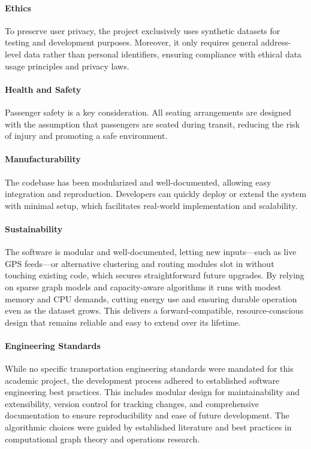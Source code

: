 \paragraph{Ethics} To preserve user privacy, the project exclusively uses synthetic datasets for testing and development purposes. Moreover, it only requires general address-level data rather than personal identifiers, ensuring compliance with ethical data usage principles and privacy laws.

\paragraph{Health and Safety} Passenger safety is a key consideration. All seating arrangements are designed with the assumption that passengers are seated during transit, reducing the risk of injury and promoting a safe environment.

\paragraph{Manufacturability} The codebase has been modularized and well-documented, allowing easy integration and reproduction. Developers can quickly deploy or extend the system with minimal setup, which facilitates real-world implementation and scalability.

\paragraph{Sustainability} The software is modular and well-documented, letting new inputs—such as live GPS feeds—or alternative clustering and routing modules slot in without touching existing code, which secures straightforward future upgrades. By relying on sparse graph models and capacity-aware algorithms it runs with modest memory and CPU demands, cutting energy use and ensuring durable operation even as the dataset grows. This delivers a forward-compatible, resource-conscious design that remains reliable and easy to extend over its lifetime.

\paragraph{Engineering Standards} While no specific transportation engineering standards were mandated for this academic project, the development process adhered to established software engineering best practices. This includes modular design for maintainability and extensibility, version control for tracking changes, and comprehensive documentation to ensure reproducibility and ease of future development. The algorithmic choices were guided by established literature and best practices in computational graph theory and operations research.


